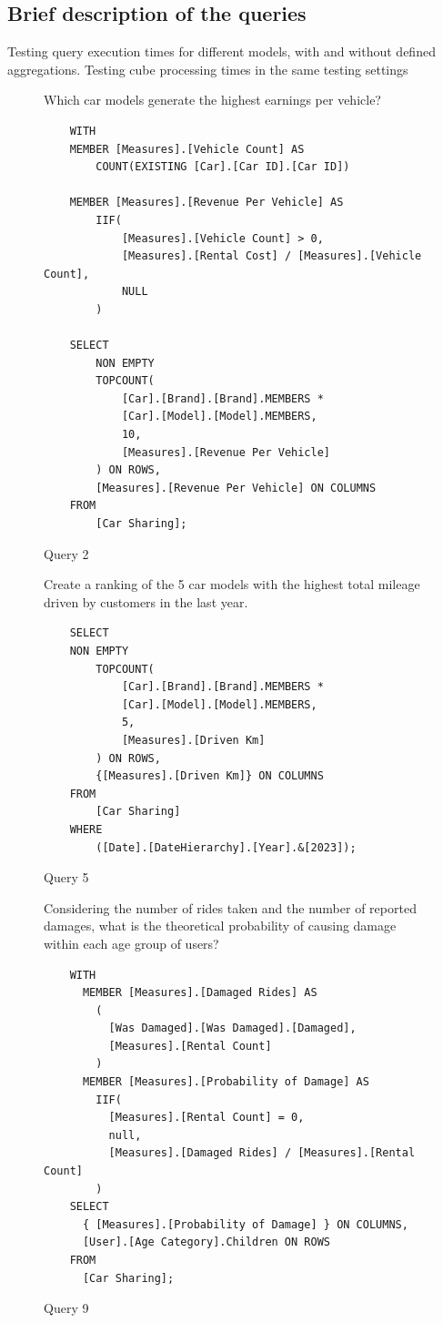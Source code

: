 \documentclass[a4paper,12pt]{article} %
\begin{document}
\subsection{Brief description of the queries}
 Testing query execution times for different models, with and without defined aggregations.
 Testing cube processing times in the same testing settings
\begin{figure}[H]
    \caption{Query 2}
    \label{lst:query2}
    Which car models generate the highest earnings per vehicle?
    \begin{verbatim}
    WITH 
    MEMBER [Measures].[Vehicle Count] AS
        COUNT(EXISTING [Car].[Car ID].[Car ID])
    
    MEMBER [Measures].[Revenue Per Vehicle] AS
        IIF(
            [Measures].[Vehicle Count] > 0, 
            [Measures].[Rental Cost] / [Measures].[Vehicle Count], 
            NULL
        )
    
    SELECT 
        NON EMPTY 
        TOPCOUNT(
            [Car].[Brand].[Brand].MEMBERS *
    		[Car].[Model].[Model].MEMBERS,
            10, 
            [Measures].[Revenue Per Vehicle]
        ) ON ROWS,
        [Measures].[Revenue Per Vehicle] ON COLUMNS
    FROM 
        [Car Sharing];
    \end{verbatim}
\end{figure}

\begin{figure}[h]
    \caption{Query 5}
    \label{lst:query5}
Create a ranking of the 5 car models with the highest total mileage driven by customers in the last year.
    \begin{verbatim}
    SELECT 
    NON EMPTY
        TOPCOUNT(
    		[Car].[Brand].[Brand].MEMBERS *
            [Car].[Model].[Model].MEMBERS,
            5,
            [Measures].[Driven Km]
        ) ON ROWS,
        {[Measures].[Driven Km]} ON COLUMNS
    FROM 
        [Car Sharing]
    WHERE 
        ([Date].[DateHierarchy].[Year].&[2023]); 
    \end{verbatim}
\end{figure}

\begin{figure}[H]
    \caption{Query 9}
    \label{lst:query9}
Considering the number of rides taken and the number of reported damages, what is the theoretical probability of causing damage within each age group of users?
    \begin{verbatim}
    WITH
      MEMBER [Measures].[Damaged Rides] AS
        (
          [Was Damaged].[Was Damaged].[Damaged],
          [Measures].[Rental Count]
        )
      MEMBER [Measures].[Probability of Damage] AS
        IIF(
          [Measures].[Rental Count] = 0,
          null,
          [Measures].[Damaged Rides] / [Measures].[Rental Count]
        )
    SELECT
      { [Measures].[Probability of Damage] } ON COLUMNS,
      [User].[Age Category].Children ON ROWS
    FROM
      [Car Sharing];
    \end{verbatim}
\end{figure}
\end{document}
